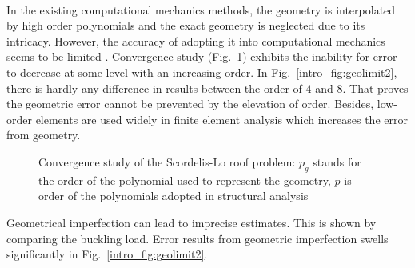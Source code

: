 \paragraph{}
In the existing computational mechanics methods, the geometry is interpolated by high order polynomials and the exact geometry is neglected due to its intricacy. However, the accuracy of adopting it into computational mechanics seems to be limited \citep{Sza2004}.
Convergence study (Fig.~\ref{intro_fig:geolimit}) exhibits the inability for error to decrease at some level with an increasing order.
In Fig.~\ref{intro_fig:geolimit2}, there is hardly any difference in results between the order of $4$ and $8$.
That proves the geometric error cannot be prevented by the elevation of order.
Besides, low-order elements are used widely in finite element analysis which increases the error from geometry.
%
\begin{figure}
    \centering
    \caption[Accuracy limit in Scordelis-Lo roof problem]{Convergence study of the Scordelis-Lo roof problem: $p_g$ stands for the order of the polynomial used to represent the geometry, $p$ is order of the polynomials adopted in structural analysis \citep{Ran2005}}
    \label{intro_fig:geolimit}
\end{figure}
%
Geometrical imperfection can lead to imprecise estimates. This is shown by comparing the buckling load.
Error results from geometric imperfection swells significantly in Fig.~\ref{intro_fig:geolimit2}.
%
